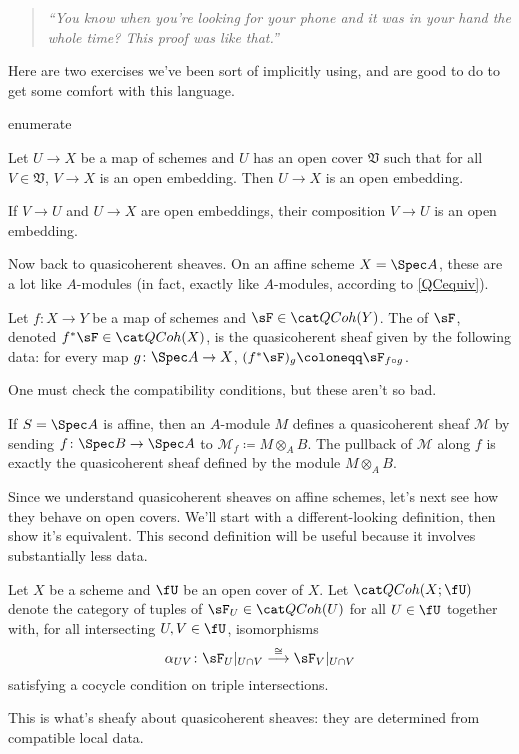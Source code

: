 \begin{quote}\textit{
	``You know when you're looking for your phone and it was in your hand the whole time? This proof was like
	that.''
}\end{quote}
Here are two exercises we've been sort of implicitly using, and are good to do to get some comfort with this
language.
\begin{comp}{ex}{enumerate}
	\item Let $U\to X$ be a map of schemes and $U$ has an open cover $\mathfrak V$ such that for all $V\in\mathfrak
	V$, $V\to X$ is an open embedding. Then $U\to X$ is an open embedding.
	\item If $V\to U$ and $U\to X$ are open embeddings, their composition $V\to U$ is an open embedding.
\end{comp}
Now back to quasicoherent sheaves. On an affine scheme $X = \Spec A$, these are a lot like $A$-modules (in fact,
exactly like $A$-modules, according to \cref{QCequiv}).
\begin{defn}
Let $f\colon X\to Y$ be a map of schemes and $\sF\in\QCoh(Y)$. The  of $\sF$, denoted
$f^*\sF\in\QCoh(X)$, is the quasicoherent sheaf given by the following data: for every map $g\colon\Spec A\to X$,
$(f^*\sF)_g\coloneqq \sF_{f\circ g}$.
\end{defn}
One must check the compatibility conditions, but these aren't so bad.

If $S = \Spec A$ is affine, then an $A$-module $M$ defines a quasicoherent sheaf $\mathscr M$ by sending
$f\colon\Spec B\to\Spec A$ to $\mathscr M_f\coloneqq M\otimes_A B$. The pullback of $\mathscr M$ along $f$ is
exactly the quasicoherent sheaf defined by the module $M\otimes_A B$.

Since we understand quasicoherent sheaves on affine schemes, let's next see how they behave on open covers. We'll
start with a different-looking definition, then show it's equivalent. This second definition will be useful because
it involves substantially less data.
\begin{defn}
Let $X$ be a scheme and $\fU$ be an open cover of $X$. Let $\QCoh(X;\fU)$ denote the category of tuples of
$\sF_U\in\QCoh(U)$ for all $U\in\fU$ together with, for all intersecting $U,V\in\fU$, isomorphisms
\begin{equation}
	\alpha_{UV}\colon\sF_U|_{U\cap V}\overset\cong\longrightarrow \sF_V|_{U\cap V}
\end{equation}
satisfying a cocycle condition on triple intersections.
\end{defn}
This is what's sheafy about quasicoherent sheaves: they are determined from compatible local data.

